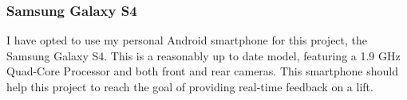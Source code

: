 \subsubsection{Samsung Galaxy S4}

I have opted to use my personal Android smartphone for this project, the Samsung Galaxy S4\cite{s4}. This is a reasonably up to date model, featuring a 1.9 GHz Quad-Core Processor and both front and rear cameras. This smartphone should help this project to reach the goal of providing real-time feedback on a lift.